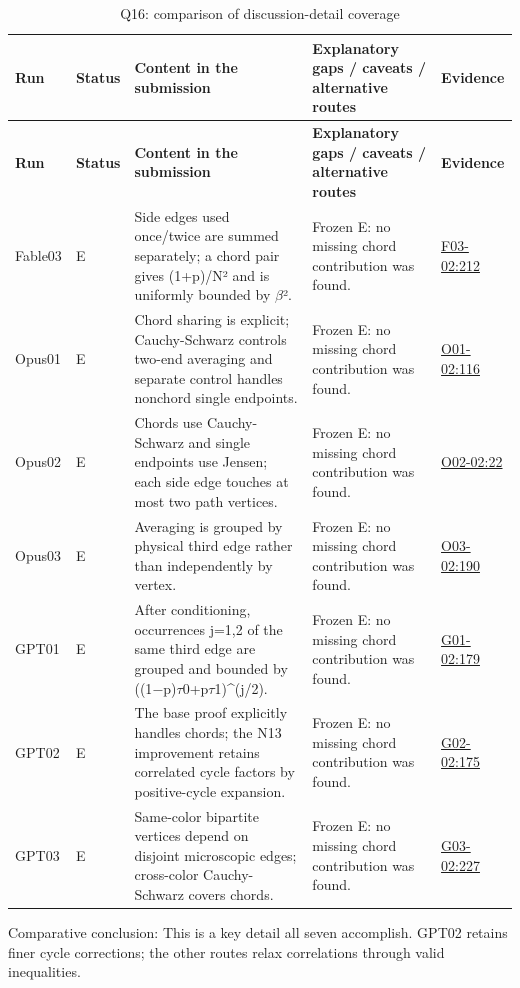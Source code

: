 \documentclass[11pt,a4paper]{article}
\begin{document}
{\fontsize{9.0}{12.6}\selectfont
\setlength{\tabcolsep}{2.5pt}
\begin{longtable}{>{\raggedright\arraybackslash}p{}>{\raggedright\arraybackslash}p{}>{\raggedright\arraybackslash}p{}>{\raggedright\arraybackslash}p{}>{\raggedright\arraybackslash}p{}}
\caption{Q16: comparison of discussion-detail coverage}\\
\toprule
\textbf{Run} & \textbf{Status} & \textbf{Content in the submission} & \textbf{Explanatory gaps /\allowbreak{} caveats /\allowbreak{} alternative routes} & \textbf{Evidence}\tabularnewline
\midrule
\endfirsthead
\toprule
\textbf{Run} & \textbf{Status} & \textbf{Content in the submission} & \textbf{Explanatory gaps /\allowbreak{} caveats /\allowbreak{} alternative routes} & \textbf{Evidence}\tabularnewline
\midrule
\endhead
{}Fable03 & E & Side edges used once/\allowbreak{}twice are summed separately; a chord pair gives (1+p)/\allowbreak{}N² and is uniformly bounded by \ensuremath{\beta}². & Frozen E: no missing chord contribution was found. & \hyperref[src:F03-02]{F03-02:212}\tabularnewline
{}Opus01 & E & Chord sharing is explicit; Cauchy-Schwarz controls two-end averaging and separate control handles nonchord single endpoints. & Frozen E: no missing chord contribution was found. & \hyperref[src:O01-02]{O01-02:116}\tabularnewline
{}Opus02 & E & Chords use Cauchy-Schwarz and single endpoints use Jensen; each side edge touches at most two path vertices. & Frozen E: no missing chord contribution was found. & \hyperref[src:O02-02]{O02-02:22}\tabularnewline
{}Opus03 & E & Averaging is grouped by physical third edge rather than independently by vertex. & Frozen E: no missing chord contribution was found. & \hyperref[src:O03-02]{O03-02:190}\tabularnewline
{}GPT01 & E & After conditioning,\allowbreak{} occurrences j=1,\allowbreak{}2 of the same third edge are grouped and bounded by ((1\ensuremath{-}p)\ensuremath{\tau}0+p\ensuremath{\tau}1)\textasciicircum{}(j/\allowbreak{}2). & Frozen E: no missing chord contribution was found. & \hyperref[src:G01-02]{G01-02:179}\tabularnewline
{}GPT02 & E & The base proof explicitly handles chords; the N13 improvement retains correlated cycle factors by positive-cycle expansion. & Frozen E: no missing chord contribution was found. & \hyperref[src:G02-02]{G02-02:175}\tabularnewline
{}GPT03 & E & Same-color bipartite vertices depend on disjoint microscopic edges; cross-color Cauchy-Schwarz covers chords. & Frozen E: no missing chord contribution was found. & \hyperref[src:G03-02]{G03-02:227}\tabularnewline
\bottomrule
\end{longtable}
}
Comparative conclusion: This is a key detail all seven accomplish. GPT02 retains finer cycle corrections; the other routes relax correlations through valid inequalities.
\end{document}
